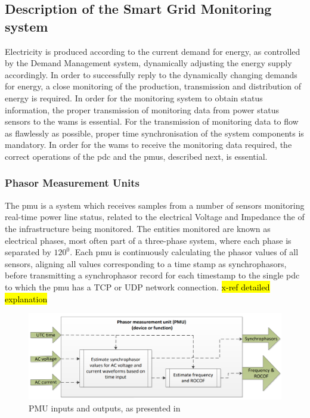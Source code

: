 \subsection{Description of the Smart Grid  Monitoring system}
Electricity is produced according to the current demand for energy, as controlled by the Demand Management system, dynamically adjusting the energy supply accordingly. In order to successfully reply to the dynamically changing demands for energy, a close monitoring of the production, transmission and distribution of energy is required. In order for the monitoring system to obtain status information, the proper transmission of monitoring data from power status sensors to the \acrshort{wams} is essential. For the transmission of monitoring data to flow as flawlessly as possible, proper time synchronisation of the system components is mandatory.
In order for the \acrshort{wams} to receive the monitoring data required, the correct operations of the \acrshort{pdc} and the \acrshort{pmu}s, described next, is essential.



\subsubsection{Phasor Measurement Units}
The \acrfull{pmu} is a system which receives samples from a number of sensors monitoring  real-time power line status, related to the electrical Voltage and Impedance the of the infrastructure being monitored. 
The entities monitored are known as electrical phases, most often part of a three-phase system, where each phase is separated by $120^0$.
Each \acrshort{pmu} is continuously calculating the phasor values of all sensors, aligning all values corresponding to a time stamp as synchrophasors, before transmitting a synchrophasor record for each timestamp to the single \acrfull{pdc} to which the \acrshort{pmu} has a  TCP or UDP network connection. \hl{x-ref detailed explanation}





\begin{figure}%
\includegraphics[width=\linewidth]{figures/PMU-in-out.png}
\caption[PMU inputs and outputs]{PMU inputs and outputs, as presented in \Cite[p.12]{iec2018measuring}
}
\label{fig:PMU-in-out}
\end{figure}

